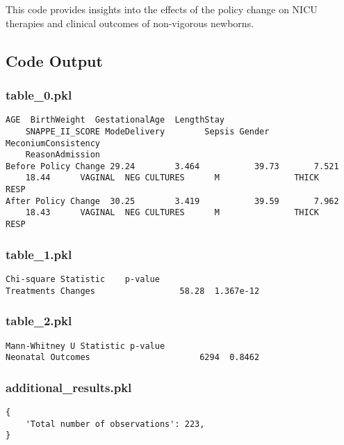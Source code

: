 \documentclass[11pt]{article}
\begin{document}
This code provides insights into the effects of the policy change on NICU therapies and clinical outcomes of non-vigorous newborns.

\subsection{Code Output}

\subsubsection*{table\_0.pkl}

\begin{Verbatim}[tabsize=4]
                       AGE  BirthWeight  GestationalAge  LengthStay
	SNAPPE_II_SCORE ModeDelivery        Sepsis Gender MeconiumConsistency
	ReasonAdmission
Before Policy Change 29.24        3.464           39.73       7.521
	18.44      VAGINAL  NEG CULTURES      M               THICK            RESP
After Policy Change  30.25        3.419           39.59       7.962
	18.43      VAGINAL  NEG CULTURES      M               THICK            RESP
\end{Verbatim}

\subsubsection*{table\_1.pkl}

\begin{Verbatim}[tabsize=4]
                    Chi-square Statistic    p-value
Treatments Changes                 58.28  1.367e-12
\end{Verbatim}

\subsubsection*{table\_2.pkl}

\begin{Verbatim}[tabsize=4]
                   Mann-Whitney U Statistic p-value
Neonatal Outcomes                      6294  0.8462
\end{Verbatim}

\subsubsection*{additional\_results.pkl}

\begin{Verbatim}[tabsize=4]
{
    'Total number of observations': 223,
}
\end{Verbatim}
\end{document}
